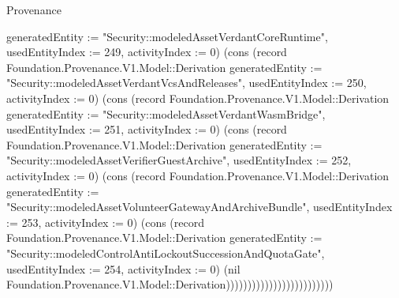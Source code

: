 \begin{lexlean}{Provenance}
\begin{semanticmodule}
{{generatedEntity := "Security::modeledAssetVerdantCoreRuntime", usedEntityIndex := 249, activityIndex := 0}) (cons (record Foundation.Provenance.V1.Model::Derivation {generatedEntity := "Security::modeledAssetVerdantVcsAndReleases", usedEntityIndex := 250, activityIndex := 0}) (cons (record Foundation.Provenance.V1.Model::Derivation {generatedEntity := "Security::modeledAssetVerdantWasmBridge", usedEntityIndex := 251, activityIndex := 0}) (cons (record Foundation.Provenance.V1.Model::Derivation {generatedEntity := "Security::modeledAssetVerifierGuestArchive", usedEntityIndex := 252, activityIndex := 0}) (cons (record Foundation.Provenance.V1.Model::Derivation {generatedEntity := "Security::modeledAssetVolunteerGatewayAndArchiveBundle", usedEntityIndex := 253, activityIndex := 0}) (cons (record Foundation.Provenance.V1.Model::Derivation {generatedEntity := "Security::modeledControlAntiLockoutSuccessionAndQuotaGate", usedEntityIndex := 254, activityIndex := 0}) (nil Foundation.Provenance.V1.Model::Derivation)))))))))))))))))))))))))
}


\end{semanticmodule}
\end{lexlean}
